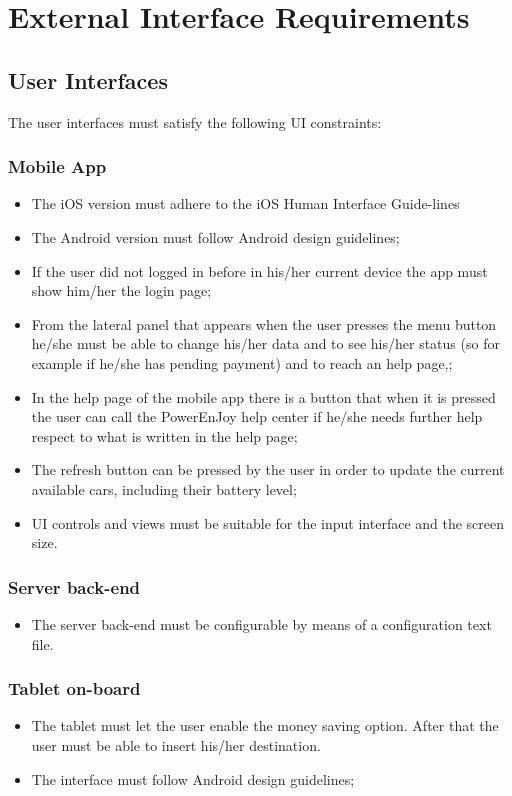 \section{External Interface Requirements}

\subsection{User Interfaces}
The user interfaces must satisfy the following UI constraints:
\subsubsection*{Mobile App}
	\begin{itemize}
	\item The iOS version must adhere to the iOS Human Interface Guide-lines
	\item The Android version must follow Android design guidelines;
	\item If the user did not logged in before in his/her current device the app must show him/her the login page;
	\item From the lateral panel that appears when the user presses the menu button he/she must be able to change his/her data and to see his/her status (so for example if he/she has pending payment) and to reach an help page,;
	\item In the help page of the mobile app there is a button that when it is pressed the user can call the PowerEnJoy help center if he/she needs further help respect to what is written in the help page;
	\item The refresh button can be pressed by the user in order to update the current available cars, including their battery level;
	\item UI controls and views must be suitable for the input interface and the screen size.
	\end{itemize}
\subsubsection*{Server back-end}
	\begin{itemize}
	\item The server back-end must be configurable by means of a configuration text file.
	\end{itemize}
\subsubsection*{Tablet on-board}
	\begin{itemize}
	\item The tablet must let the user enable the money saving option. After that the user must be able to insert his/her destination.
	\item The interface must follow Android design guidelines;
	\end{itemize}
